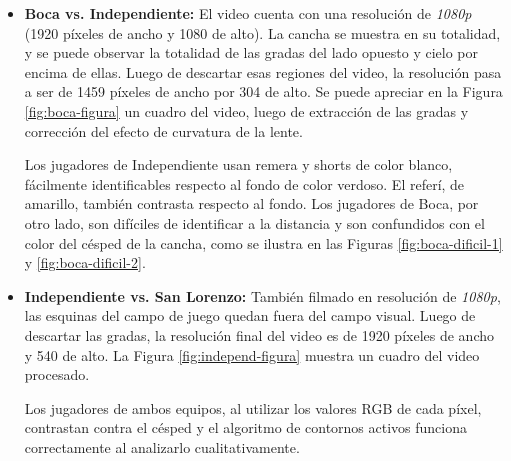 \begin{itemize}

  \item \textbf{Boca vs. Independiente:} El video cuenta con una resolución de
    \textit{1080p} (1920 píxeles de ancho y 1080 de alto). La cancha se muestra
    en su totalidad, y se puede observar la totalidad de las gradas del lado
    opuesto y cielo por encima de ellas. Luego de descartar esas regiones del
    video, la resolución pasa a ser de 1459 píxeles de ancho por 304 de alto.
    Se puede apreciar en la Figura \ref{fig:boca-figura} un cuadro del video, luego
    de extracción de las gradas y corrección del efecto de curvatura de la
    lente.

    Los jugadores de Independiente usan remera y shorts de color blanco,
    fácilmente identificables respecto al fondo de color verdoso. El referí, de
    amarillo, también contrasta respecto al fondo. Los jugadores de Boca, por
    otro lado, son difíciles de identificar a la distancia y son confundidos
    con el color del césped de la cancha, como se ilustra en las Figuras
    \ref{fig:boca-dificil-1} y \ref{fig:boca-dificil-2}.

  \item \textbf{Independiente vs. San Lorenzo:} También filmado en resolución de
    \textit{1080p}, las esquinas del campo de juego quedan fuera del campo
    visual. Luego de descartar las gradas, la resolución final del video es de
    1920 píxeles de ancho y 540 de alto. La Figura \ref{fig:independ-figura}
    muestra un cuadro del video procesado.

    Los jugadores de ambos equipos, al utilizar los valores RGB de cada píxel,
    contrastan contra el césped y el algoritmo de contornos activos funciona
    correctamente al analizarlo cualitativamente.

\end{itemize}

